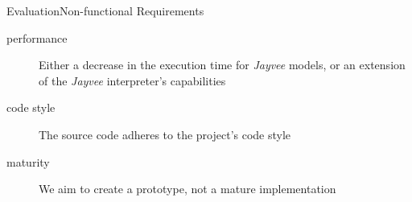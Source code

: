 \begin{frame}[t]{Evaluation}{Non-functional Requirements}
	\begin{description}
		\item[performance] Either a decrease in the execution time for \emph{Jayvee} models, or an extension of the \emph{Jayvee} interpreter's capabilities \uncover<2->{({\color{green} \checkmark})}
		\item[code style] The source code adheres to the project's code style \uncover<3->{({\color{green} \checkmark})}
		\item[maturity] We aim to create a prototype, not a mature implementation \uncover<4->{({\color{green} \checkmark})}
	\end{description}
\end{frame}

